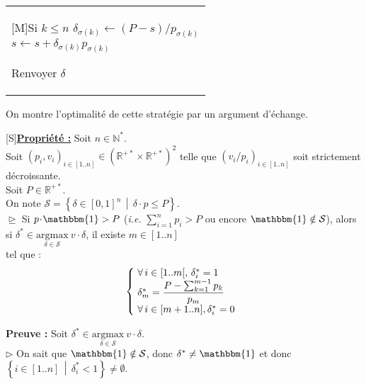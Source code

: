 \documentclass{scrartcl}
\renewcommand{\cal}[1]{\mathcal{#1}}
\newcommand{\bb}[1]{\mathbb{#1}}
\newcommand{\elt}[1]{\textbf{#1}}
\newcommand{\dotp}{\! \cdot \!}
\newcommand{\x}{\! \times \!}
\newcommand{\1}{\mathbbm{1}}
\begin{document}
				\\
				\hspace*{10mm}
				\begin{tabular}{|| l}
					\parbox{150mm}{
						\begin{center}[M]{Si $k \leq n$}
							\( \delta_{\sigma(k)} \leftarrow (P - s)/p_{\sigma(k)} \) \\
							\( s \leftarrow s + \delta_{\sigma(k)} p_{\sigma(k)} \)
						\end{center}
						Renvoyer $\delta$
					}
				\end{tabular}
			
			On montre l'optimalité de cette stratégie par un argument d'échange.
				\\[0mm]
			\begin{center}[S]{\elt{\underline{Propriété :}}}
				Soit $n \in \bb{N}^*$. \\
				Soit \( (p_i, v_i)_{i \in [1..n]} \in (\bb{R}^{+*} \x \bb{R}^{+*})^2 \) telle que \( \left( v_i/p_i \right)_{i \in [1..n]} \) soit strictement décroissante. \\[-0.8mm]
				Soit $P \in \bb{R}^{+*}$. \\
				On note \( \cal{S} = \left\{ \delta \in [0, 1]^n \, \middle| \, \delta \dotp p \leq P \right\} \).
				\\[1mm]
				$\trianglerighteq$ Si \( p \dotp \1 > P \) (\emph{i.e.} \( \displaystyle \sum_{i=1}^n p_i > P \) ou encore \( \1 \notin \cal{S} \)), alors si \( \delta^* \in \underset{\delta \in \cal{S}}{\mathrm{argmax}} \: v \dotp \delta \), il existe \( m \in [1..n] \) \\[-3.2mm] tel que :
				\\[-8mm] \renewcommand{\arraystretch}{1.2}
					\[
						\left\lbrace \hspace{-1mm}
						\begin{tabular}{l}
							\( \forall \, i \in [1..m[, \, \delta^*_i = 1 \) \\
							\( \delta^*_m = \displaystyle \frac{P - \sum_{k=1}^{m-1} p_k}{p_m} \) \\
							\( \forall \, i \in [m+1..n], \delta^*_i = 0 \)
						\end{tabular} \right.
					\]
				\renewcommand{\arraystretch}{1}
			\end{center}
			\elt{Preuve :} Soit \( \delta^* \in \underset{\delta \in \cal{S}}{\mathrm{argmax}} \: v \dotp \delta \). \\
			$\triangleright$ On sait que $\1 \notin \cal{S}$, donc $\delta^* \neq \1$ et donc \( \left\{ i \in [1..n] \, \middle| \, \delta^*_i < 1 \right\} \neq \emptyset \).
\end{document}
